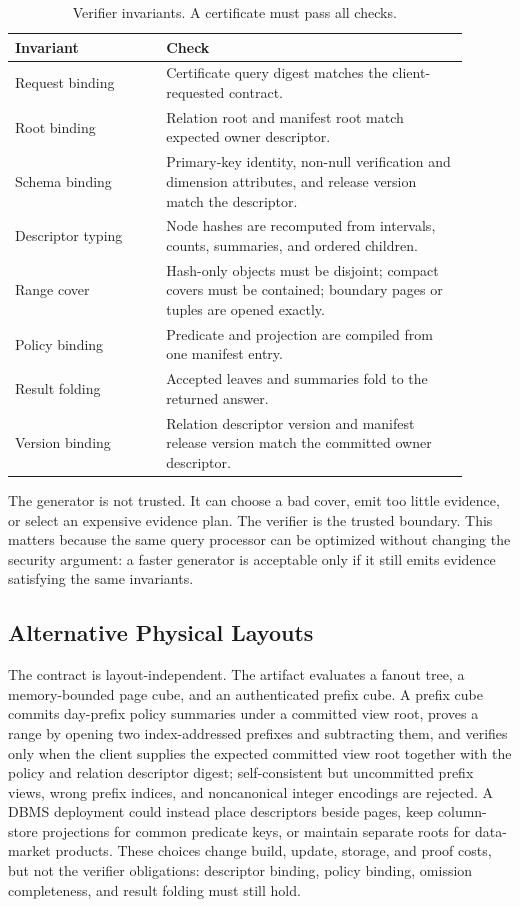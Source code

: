\documentclass[conference]{IEEEtran}
\begin{document}
\begin{table}[t]
\centering
\caption{Verifier invariants. A certificate must pass all checks.}
\label{tab:invariants}
\scriptsize
\begin{tabular}{p{0.30\linewidth}p{0.60\linewidth}}
\toprule
Invariant & Check \\
\midrule
Request binding & Certificate query digest matches the client-requested contract. \\
Root binding & Relation root and manifest root match expected owner descriptor. \\
Schema binding & Primary-key identity, non-null verification and dimension attributes, and release version match the descriptor. \\
Descriptor typing & Node hashes are recomputed from intervals, counts, summaries, and ordered children. \\
Range cover & Hash-only objects must be disjoint; compact covers must be contained; boundary pages or tuples are opened exactly. \\
Policy binding & Predicate and projection are compiled from one manifest entry. \\
Result folding & Accepted leaves and summaries fold to the returned answer. \\
Version binding & Relation descriptor version and manifest release version match the committed owner descriptor. \\
\bottomrule
\end{tabular}
\end{table}

The generator is not trusted. It can choose a bad cover, emit too little evidence, or select an expensive evidence plan. The verifier is the trusted boundary. This matters because the same query processor can be optimized without changing the security argument: a faster generator is acceptable only if it still emits evidence satisfying the same invariants.

\subsection{Alternative Physical Layouts}
The contract is layout-independent. The artifact evaluates a fanout tree, a memory-bounded page cube, and an authenticated prefix cube. A prefix cube commits day-prefix policy summaries under a committed view root, proves a range by opening two index-addressed prefixes and subtracting them, and verifies only when the client supplies the expected committed view root together with the policy and relation descriptor digest; self-consistent but uncommitted prefix views, wrong prefix indices, and noncanonical integer encodings are rejected. A DBMS deployment could instead place descriptors beside pages, keep column-store projections for common predicate keys, or maintain separate roots for data-market products. These choices change build, update, storage, and proof costs, but not the verifier obligations: descriptor binding, policy binding, omission completeness, and result folding must still hold.
\end{document}
